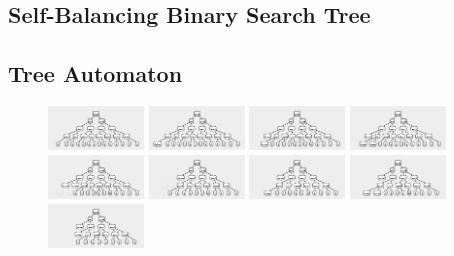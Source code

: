 \documentclass{article}
\begin{document}
\subsection{Self-Balancing Binary Search Tree}
\subsection{Tree Automaton}
\begin{figure}
\begin{center}
\includegraphics[width=1in]{../board/pics/ss301.png}
\includegraphics[width=1in]{../board/pics/ss351.png}
\includegraphics[width=1in]{../board/pics/ss401.png}
\includegraphics[width=1in]{../board/pics/ss451.png}
\includegraphics[width=1in]{../board/pics/ss501.png}
\includegraphics[width=1in]{../board/pics/ss551.png}
\includegraphics[width=1in]{../board/pics/ss601.png}
\includegraphics[width=1in]{../board/pics/ss651.png}
\includegraphics[width=1in]{../board/pics/ss701.png}

\end{center}
\end{figure}
\end{document}
